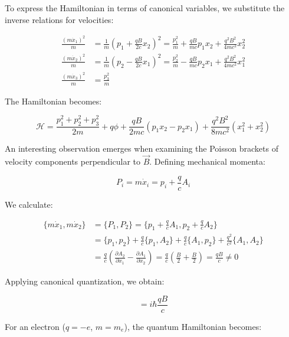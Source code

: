 \documentclass[italian]{HKNdocument}
\begin{document}
To express the Hamiltonian in terms of canonical variables, we substitute the inverse relations for velocities:

\begin{align}
\frac{(m\dot{x}_{1})^{2}}{m} &= \frac{1}{m}(p_{1}+\frac{q B}{2 c} x_{2})^{2}=\frac{p_{1}^{2}}{m}+\frac{q B}{m c} p_{1}x_{2}+\frac{q^{2}B^{2}}{4mc^{2}}x_{2}^{2} \\
\frac{(m\dot{x}_{2})^{2}}{m} &= \frac{1}{m}(p_{2}-\frac{q B}{2 c} x_{1})^{2}=\frac{p_{2}^{2}}{m}-\frac{q B}{m c}p_{2}x_{1}+\frac{q^{2}B^{2}}{4mc^{2}}x_{1}^{2}  \label{eq:12.9}\\
\frac{(m\dot{x}_{3})^{2}}{m} &= \frac{p_{3}^{2}}{m}
\end{align}

The Hamiltonian becomes:

\begin{equation}
\mathcal{H}=\frac{p_{1}^{2}+p_{2}^{2}+p_{3}^{2}}{2m}+q\phi+\frac{qB}{2mc}(p_{1}x_{2}-p_{2}x_{1})+\frac{q^{2}B^{2}}{8mc^{2}}(x_{1}^{2}+x_{2}^{2}) \label{eq:12.10}
\end{equation}

An interesting observation emerges when examining the Poisson brackets of velocity components perpendicular to $\vec{B}$. Defining mechanical momenta:

\begin{equation}
P_{i}=m\dot{x}_{i}=p_{i}+\frac{q}{c}A_{i} \label{eq:12.11}
\end{equation}

We calculate:

\begin{align}
\{m\dot{x}_{1},m\dot{x}_{2}\} &= \{P_{1},P_{2}\}=\{p_{1}+\frac{q}{c}A_{1},p_{2}+\frac{q}{c}A_{2}\}\\
&= \{p_{1},p_{2}\}+\frac{q}{c}\{p_{1},A_{2}\}+\frac{q}{c}\{A_{1},p_{2}\}+\frac{q^{2}}{c^{2}}\{A_{1},A_{2}\}\\
&= \frac{q}{c}(\frac{\partial A_{2}}{\partial x_{1}}-\frac{\partial A_{1}}{\partial x_{2}})=\frac{q}{c}(\frac{B}{2}+\frac{B}{2})=\frac{qB}{c}\neq 0 \label{eq:12.12}
\end{align}

Applying canonical quantization, we obtain:

\begin{equation}
[P_{1},P_{2}]=i\hbar\frac{qB}{c} \label{eq:12.13}
\end{equation}

For an electron ($q=-e$, $m=m_e$), the quantum Hamiltonian becomes:
\end{document}
